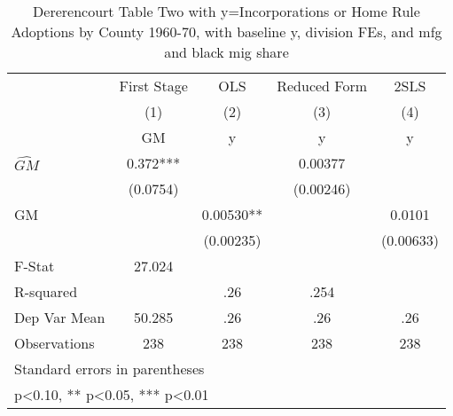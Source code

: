 \begin{table}[htbp]\centering
\def\sym#1{\ifmmode^{#1}\else\(^{#1}\)\fi}
\caption{Dererencourt Table Two with y=Incorporations or Home Rule Adoptions by County 1960-70, with baseline y, division FEs, and mfg and black mig share}
\begin{tabular}{l*{4}{c}}
\toprule
                    & First Stage   &         OLS   &Reduced Form   &        2SLS   \\
                    &\multicolumn{1}{c}{(1)}&\multicolumn{1}{c}{(2)}&\multicolumn{1}{c}{(3)}&\multicolumn{1}{c}{(4)}\\
                    &\multicolumn{1}{c}{GM}&\multicolumn{1}{c}{y}&\multicolumn{1}{c}{y}&\multicolumn{1}{c}{y}\\
\midrule
$\hat{GM}$          &       0.372***&               &     0.00377   &               \\
                    &    (0.0754)   &               &   (0.00246)   &               \\
\addlinespace
GM                  &               &     0.00530** &               &      0.0101   \\
                    &               &   (0.00235)   &               &   (0.00633)   \\
\midrule
F-Stat              &      27.024   &               &               &               \\
R-squared           &               &         .26   &        .254   &               \\
Dep Var Mean        &      50.285   &         .26   &         .26   &         .26   \\
Observations        &         238   &         238   &         238   &         238   \\
\bottomrule
\multicolumn{5}{l}{\footnotesize Standard errors in parentheses}\\
\multicolumn{5}{l}{\footnotesize * p<0.10, ** p<0.05, *** p<0.01}\\
\end{tabular}
\end{table}
